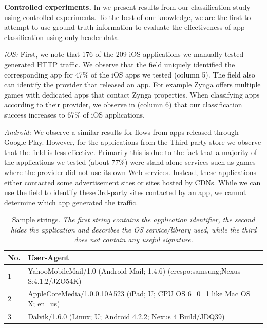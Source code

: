 
\noindent\textbf{Controlled experiments.}
In  we present results from our classification study using controlled experiments. To 
the best of our knowledge, we are the first to attempt to use ground-truth information to evaluate the 
effectiveness of app classification using only header data.
 

\emph{iOS:}
First, we note that 176 of the 209 iOS applications we manually tested generated HTTP traffic.
We observe that the \httphost field uniquely identified the corresponding app for 47\% of the iOS apps we tested (column 5).
The \httphost field also can identify the provider that released an app.
For example Zynga offers multiple games with dedicated apps that contact Zynga properties.
When classifying apps according to their provider, we observe in  (column 6) that our classification success increases to 67\% of iOS applications. 


\emph{Android:} We observe a similar results for flows from apps released through Google Play.
However, for the applications from the Third-party store we observe that the \httphost field is less effective. 
Primarily this is due to the fact that a majority of the applications we tested (about 77\%) were stand-alone services such as games where the provider did not use its own Web services. Instead, these applications either contacted some advertisement sites or sites hosted by CDNs. 
While we can use the \httphost field to identify these 3rd-party sites contacted by an app, we cannot determine which app generated the traffic. 

\begin{table}
\begin{small}
\begin{tabular}{|l|p{}|}
\hline
{\bf No. } & {\bf User-Agent}\tabularnewline
\hline
1 & YahooMobileMail/1.0 (Android Mail; 1.4.6) (crespo;samsung;Nexus S;4.1.2/JZO54K)\tabularnewline
\hline
2 & AppleCoreMedia/1.0.0.10A523 (iPad; U; CPU OS 6\_0\_1 like Mac OS X; en\_us) \tabularnewline
\hline
3 & Dalvik/1.6.0 (Linux; U; Android 4.2.2; Nexus 4 Build/JDQ39) \tabularnewline
\hline
\end{tabular}
\end{small}
\caption{Sample \useragent strings. \emph{The first string contains the application identifier, the second hides the application and describes the OS service/library used, while the third does not contain any useful signature.}}
\label{tab:user-agent}
\end{table}

